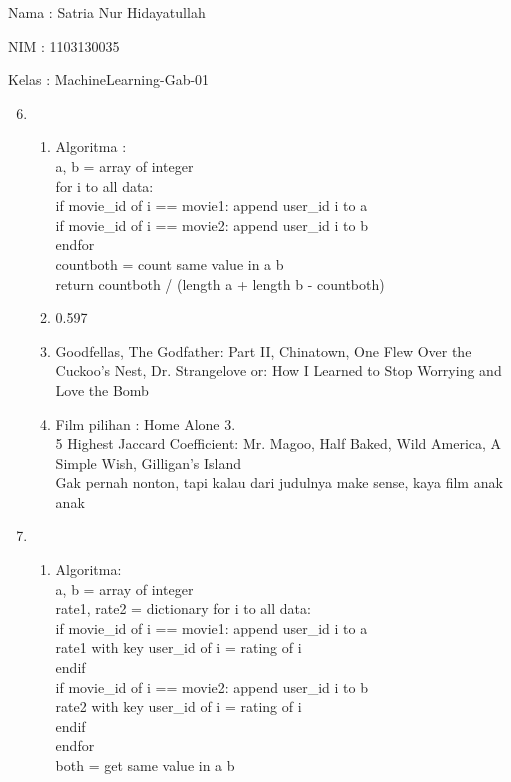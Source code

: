 \documentclass{article}
\begin{document}
Nama : Satria Nur Hidayatullah

NIM : 1103130035

Kelas : MachineLearning-Gab-01\\

\begin{enumerate}
	\setcounter{enumi}{5}
	\item
	\begin{enumerate}
		\item Algoritma :\\
		a, b = array of integer\\
		for i to all data:\\
		if movie\_id of i == movie1: append user\_id i to a\\
		if movie\_id of i == movie2: append user\_id i to b\\
		endfor\\
		countboth = count same value in a b\\
		return countboth / (length a + length b - countboth)
		\item 0.597
		\item Goodfellas, The Godfather: Part II, Chinatown, One Flew Over the Cuckoo's Nest, Dr. Strangelove or: How I Learned to Stop Worrying and Love the Bomb
		\item Film pilihan : Home Alone 3.\\
		5 Highest Jaccard Coefficient: Mr. Magoo, Half Baked, Wild America, A Simple Wish, Gilligan's Island\\
		Gak pernah nonton, tapi kalau dari judulnya make sense, kaya film anak anak
	\end{enumerate}
	\item
	\begin{enumerate}
	\item Algoritma:\\
	a, b = array of integer\\
	rate1, rate2 = dictionary
	for i to all data:\\
	if movie\_id of i == movie1:
	append user\_id i to a\\
	rate1 with key user\_id of i = rating of i\\
	endif\\
	if movie\_id of i == movie2:
	append user\_id i to b\\
	rate2 with key user\_id of i = rating of i\\
	endif\\
	endfor\\
	both = get same value in a b\\

\end{enumerate}
\end{enumerate}
\end{document}

